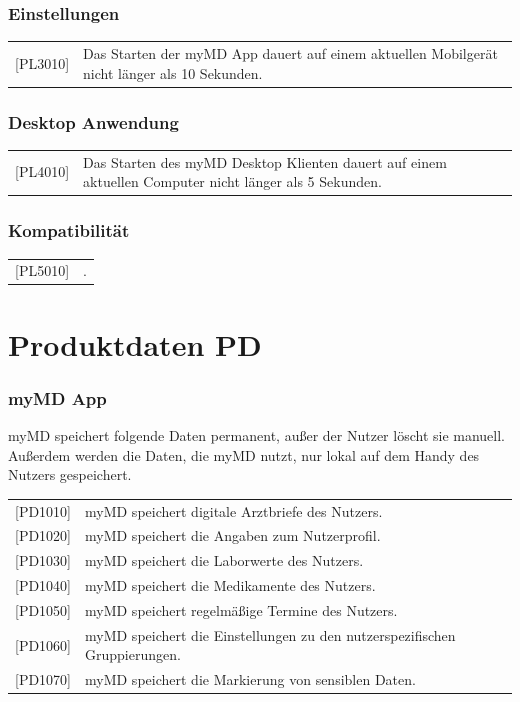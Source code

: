 \documentclass[a4paper]{scrreprt}
\begin{document}
\subsection{Einstellungen}
\begin{tabular}{lll}
[PL3010]&  \multicolumn{2}{p{12cm}}{Das Starten der myMD App dauert auf einem aktuellen Mobilgerät nicht länger als 10 Sekunden.}\\


\end{tabular}

\subsection{Desktop Anwendung}
\begin{tabular}{lll}
[PL4010]&  \multicolumn{2}{p{12cm}}{Das Starten des myMD Desktop Klienten dauert auf einem aktuellen Computer nicht länger als 5 Sekunden.}\\

\end{tabular}

\subsection{Kompatibilität}
\begin{tabular}{lll}
[PL5010]&  \multicolumn{2}{p{12cm}}{.}\\

\end{tabular}


\chapter{Produktdaten PD}
\subsection{myMD \gls{App}}
myMD speichert folgende Daten permanent, außer der Nutzer löscht sie manuell. Außerdem werden die Daten, die myMD nutzt, nur lokal auf dem Handy des Nutzers gespeichert.
\newline
\newline
\begin{tabular}{lll}
[PD1010]&  \multicolumn{2}{p{12cm}}{myMD speichert digitale Arztbriefe des Nutzers.}\\
{[PD1020]} &  \multicolumn{2}{p{12cm}}{myMD speichert die Angaben zum Nutzerprofil.}\\
{[PD1030]} &  \multicolumn{2}{p{12cm}}{myMD speichert die Laborwerte des Nutzers.}\\
{[PD1040]} &  \multicolumn{2}{p{12cm}}{myMD speichert die Medikamente des Nutzers.}  \\
{[PD1050]} &  \multicolumn{2}{p{12cm}}{myMD speichert regelmäßige Termine des Nutzers.}  \\
{[PD1060]} &  \multicolumn{2}{p{12cm}}{myMD speichert die Einstellungen zu den nutzerspezifischen Gruppierungen.}  \\
{[PD1070]} &  \multicolumn{2}{p{12cm}}{myMD speichert die Markierung von sensiblen Daten.}  \\

\end{tabular}
\end{document}

